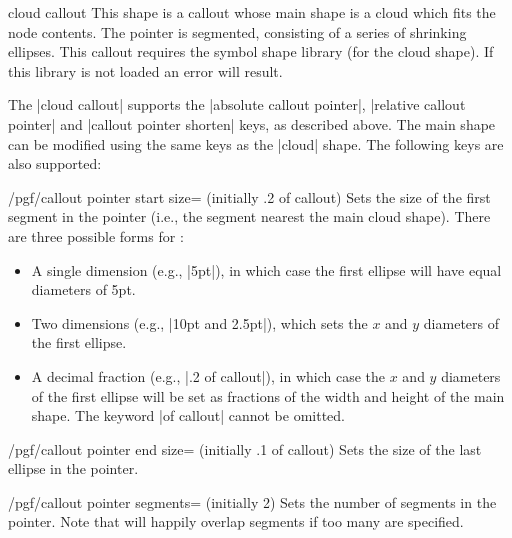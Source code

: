 \begin{shape}{cloud callout}
This shape is a callout whose main shape is a cloud which fits the
node contents. The pointer is segmented, consisting of a series of
shrinking ellipses. This callout requires the symbol shape library
(for the cloud shape). If this library is not loaded an error will
result.

\begin{codeexample}[]
\end{codeexample}

The |cloud callout| supports the |absolute callout pointer|,
|relative callout pointer| and |callout pointer shorten| keys, as
described above.
The main shape can be modified using the same keys as the |cloud|
shape. The following keys are also supported:

\begin{key}{/pgf/callout pointer start size= (initially .2 of callout)}
	Sets the size of the first segment in the pointer (i.e., the segment
	nearest the main cloud shape). There are three possible forms for
	:
	\begin{itemize}
		\item
			A single dimension (e.g., |5pt|), in which case the first ellipse
			will have equal diameters of 5pt.
		\item
			Two dimensions (e.g., |10pt and 2.5pt|), which sets the $x$ and
			$y$ diameters of the first ellipse.
		\item
			A decimal fraction (e.g., |.2 of callout|), in which case
			the $x$ and $y$ diameters of the first ellipse will be set as
			fractions of the width and height of the main shape. The keyword
			|of callout| cannot be omitted.	
	\end{itemize}
\end{key}

\begin{key}{/pgf/callout pointer end size= (initially .1 of callout)}
	Sets the size of the last ellipse in the pointer.
\end{key}

\begin{key}{/pgf/callout pointer segments= (initially 2)}
	Sets the number of segments in the pointer. Note that \pgfname{} will
	happily	overlap segments if too many are specified.
\end{key}


\end{shape}
